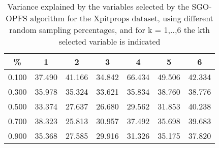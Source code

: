 \begin{table}
	\begin{center}
		\begin{tabular}{c c c c c c c}
			\% & 1 & 2 & 3 & 4 & 5 & 6 \\
			\hline
			0.100 & 37.490 & 41.166 & 34.842 & 66.434 & 49.506 & 42.334 \\
			0.300 & 35.978 & 35.324 & 33.621 & 35.834 & 38.760 & 38.776 \\
			0.500 & 33.374 & 27.637 & 26.680 & 29.562 & 31.853 & 40.238 \\
			0.700 & 38.323 & 25.813 & 30.957 & 37.492 & 35.698 & 39.683 \\
			0.900 & 35.368 & 27.585 & 29.916 & 31.326 & 35.175 & 37.820 \\
		\end{tabular}
	\end{center}
	\caption{Variance explained by the variables selected by the SGO-OPFS algorithm for the Xpitprops dataset, using different random sampling percentages, and for k = 1,..,6 the kth selected variable is indicated}
\end{table}